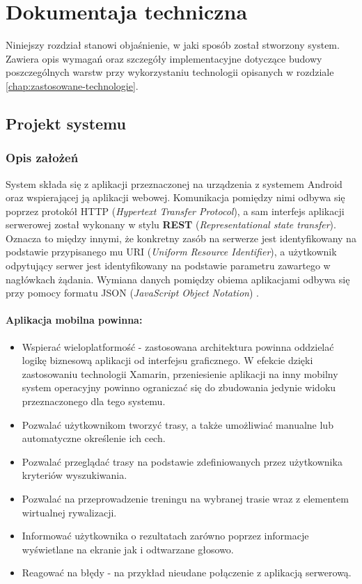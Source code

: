 \chapter{Dokumentaja techniczna}\label{chap:dokumentacja-techniczna}
Niniejszy rozdział stanowi objaśnienie, w jaki sposób został stworzony system. Zawiera opis wymagań oraz szczegóły implementacyjne dotyczące budowy poszczególnych warstw przy wykorzystaniu technologii opisanych w rozdziale \ref{chap:zastosowane-technologie}.
\section{Projekt systemu}
\subsection{Opis założeń}
System składa się z aplikacji przeznaczonej na urządzenia z systemem Android \cite{android} oraz wspierającej ją aplikacji webowej. Komunikacja pomiędzy nimi odbywa się poprzez protokół HTTP (\textit{Hypertext Transfer Protocol}), a sam interfejs aplikacji serwerowej został wykonany w stylu \textbf{REST} (\textit{Representational state transfer}). Oznacza to między innymi, że konkretny zasób na serwerze jest identyfikowany na podstawie przypisanego mu URI (\textit{Uniform Resource Identifier}), a użytkownik odpytujący serwer jest identyfikowany na podstawie parametru zawartego w nagłówkach żądania. Wymiana danych pomiędzy obiema aplikacjami odbywa się przy pomocy formatu JSON (\textit{JavaScript Object Notation}) \cite{ksiazka-asp-core}.

\subsubsection{Aplikacja mobilna powinna:}
\begin{itemize}
\item{Wspierać wieloplatformość} - zastosowana architektura powinna oddzielać logikę biznesową aplikacji od interfejsu graficznego. W efekcie dzięki zastosowaniu technologii Xamarin, przeniesienie aplikacji na inny mobilny system operacyjny powinno ograniczać się do zbudowania jedynie widoku przeznaczonego dla tego systemu.
\item{Pozwalać użytkownikom tworzyć trasy, a także umożliwiać manualne lub automatyczne określenie ich cech.}
\item{Pozwalać przeglądać trasy na podstawie zdefiniowanych przez użytkownika kryteriów wyszukiwania.}
\item{Pozwalać na przeprowadzenie treningu na wybranej trasie wraz z elementem wirtualnej rywalizacji.}
\item{Informować użytkownika o rezultatach zarówno poprzez informacje wyświetlane na ekranie jak i odtwarzane głosowo.}
\item{Reagować na błędy - na przykład nieudane połączenie z aplikacją serwerową.}
\end{itemize}

